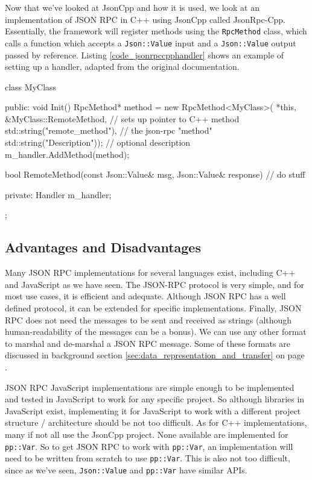 Now that we've looked at JsonCpp and how it is used, we look at an implementation of JSON RPC in C++ using JsonCpp called JsonRpc-Cpp\cite{jsonrpccpp}. Essentially, the framework will register methods using  the \lstinline{RpcMethod} class, which calls a function which accepts a \lstinline{Json::Value} input and a \lstinline{Json::Value} output passed by reference. Listing \ref{code_jsonrpccpphandler} shows an example of setting up a handler, adapted from the original documentation.

\begin{code}
class MyClass
{
   public:
     void Init()
     {
       RpcMethod* method = new RpcMethod<MyClass>(
           *this, &MyClass::RemoteMethod, // sets up pointer to C++ method
           std::string("remote_method"),  // the json-rpc "method"
           std::string("Description"));   // optional description
       m_handler.AddMethod(method);
     }

     bool RemoteMethod(const Json::Value& msg, Json::Value& response)
     {
       // do stuff
     }

   private:
     Handler m_handler;
};
\end{code}

\subsection{Advantages and Disadvantages} %
\label{sub:jsonrpc_advantages_and_disadvantages}
Many JSON RPC implementations for several languages exist\cite{wikijsonrpc}, including C++ and JavaScript as we have seen. The JSON-RPC protocol is very simple, and for most use cases, it is efficient and adequate. Although JSON RPC has a well defined protocol, it can be extended for specific implementations. Finally, JSON RPC does not need the messages to be sent and received as strings (although human-readability of the messages can be a bonus). We can use any other format to marshal and de-marshal a JSON RPC message. Some of these formats are discussed in background section \ref{sec:data_representation_and_transfer} on page \pageref{sec:data_representation_and_transfer}.

JSON RPC JavaScript implementations are simple enough to be implemented and tested in JavaScript to work for any specific project. So although libraries in JavaScript exist, implementing it for JavaScript to work with a different project structure / architecture should be not too difficult. As for C++ implementations, many if not all use the JsonCpp project. None available are implemented for \lstinline{pp::Var}. So to get JSON RPC to work with \lstinline{pp::Var}, an implementation will need to be written from scratch to use \lstinline{pp::Var}. This is also not too difficult, since as we've seen, \lstinline{Json::Value} and \lstinline{pp::Var} have similar APIs.


